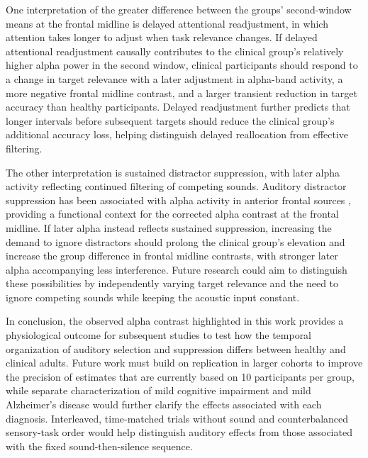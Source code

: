 \documentclass[11pt,letterpaper]{article}
\begin{document}
One interpretation of the greater difference between the groups' second-window means at the frontal midline is delayed attentional readjustment, in which attention takes longer to adjust when task relevance changes. If delayed attentional readjustment causally contributes to the clinical group's relatively higher alpha power in the second window, clinical participants should respond to a change in target relevance with a later adjustment in alpha-band activity, a more negative frontal midline contrast, and a larger transient reduction in target accuracy than healthy participants. Delayed readjustment further predicts that longer intervals before subsequent targets should reduce the clinical group's additional accuracy loss, helping distinguish delayed reallocation from effective filtering.

The other interpretation is sustained distractor suppression, with later alpha activity reflecting continued filtering of competing sounds. Auditory distractor suppression has been associated with alpha activity in anterior frontal sources \cite{wostmann}, providing a functional context for the corrected alpha contrast at the frontal midline. If later alpha instead reflects sustained suppression, increasing the demand to ignore distractors should prolong the clinical group's elevation and increase the group difference in frontal midline contrasts, with stronger later alpha accompanying less interference. Future research could aim to distinguish these possibilities by independently varying target relevance and the need to ignore competing sounds while keeping the acoustic input constant.

In conclusion, the observed alpha contrast highlighted in this work provides a physiological outcome for subsequent studies to test how the temporal organization of auditory selection and suppression differs between healthy and clinical adults. Future work must build on replication in larger cohorts to improve the precision of estimates that are currently based on 10 participants per group, while separate characterization of mild cognitive impairment and mild Alzheimer's disease would further clarify the effects associated with each diagnosis. Interleaved, time-matched trials without sound and counterbalanced sensory-task order would help distinguish auditory effects from those associated with the fixed sound-then-silence sequence.
\end{document}
